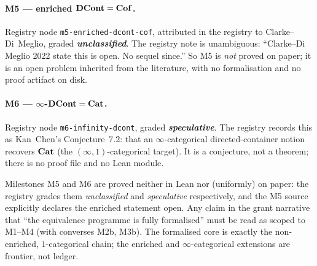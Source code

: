 \paragraph{M5 --- enriched $\mathbf{DCont}=\mathbf{Cof}$.}
Registry node \texttt{m5-enriched-dcont-cof}, attributed in the registry to
Clarke--Di~Meglio, graded \textbf{\emph{unclassified}}. The registry note is
unambiguous: ``Clarke--Di Meglio 2022 state this is open. No sequel since.'' So M5
is \emph{not} proved on paper; it is an open problem inherited from the literature,
with no formalisation and no proof artifact on disk.

\paragraph{M6 --- $\infty$-$\mathbf{DCont}=\mathbf{Cat}$.}
Registry node \texttt{m6-infinity-dcont}, graded
\textbf{\emph{speculative}}. The registry records this as Kan~Chen's
Conjecture~7.2: that an
$\infty$-categorical directed-container notion recovers $\mathbf{Cat}$ (the
$(\infty,1)$-categorical target). It is a conjecture, not a theorem; there is no
proof file and no Lean module.

\begin{remark}\label{rem:mile-ledger3}
Milestones M5 and M6 are proved neither in Lean nor (uniformly) on paper: the
registry grades them \emph{unclassified} and \emph{speculative} respectively, and
the M5 source explicitly declares the enriched statement open. Any claim in the
grant narrative that ``the equivalence programme is fully formalised'' must be read
as scoped to M1--M4 (with converses M2b, M3b). The formalised core is exactly the
non-enriched, $1$-categorical chain; the enriched and $\infty$-categorical
extensions are frontier, not ledger.
\end{remark}


